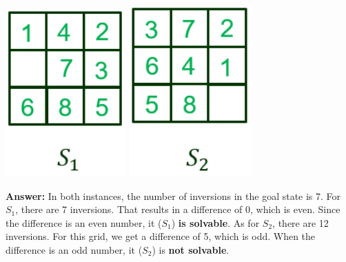 \documentclass{article}
\begin{document}
\begin{enumerate}
\begin{enumerate}[label=($\alph*$)]
    \begin{center}
        \includegraphics[scale=0.75]{472-PS1-Q3-S1.png} \hspace{5 cm} \includegraphics[scale=0.75]{472-PS1-Q3-S2.png}
    \end{center}

    \color{blue}\textbf{Answer:} In both instances, the number of inversions in the goal state is 7. For $S_1$, there are 7 inversions. That results in a difference of 0, which is even. Since the difference is an even number, it ($S_1$) \textbf{is solvable}. As for $S_2$, there are 12 inversions. For this grid, we get a difference of 5, which is odd. When the difference is an odd number, it ($S_2$) is \textbf{not solvable}. \color{black}

    
    \end{enumerate}


\end{enumerate}
\end{document}
